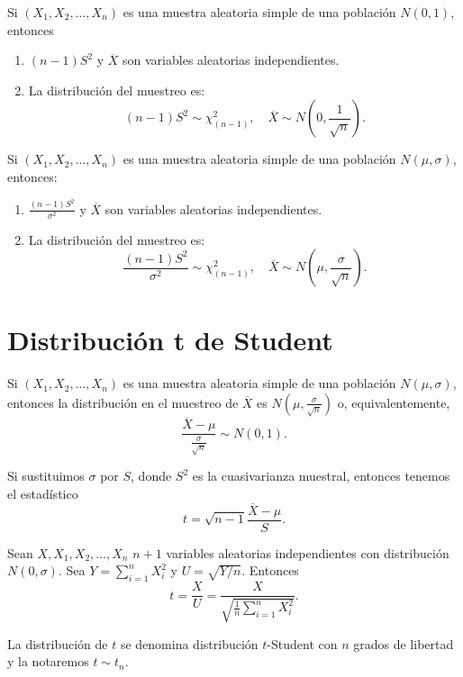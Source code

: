 \begin{theorem}
    Si $(X_1, X_2, \dots, X_n)$ es una muestra aleatoria simple de una población $N(0,1)$, entonces
    \begin{enumerate}
        \item $(n-1)S^2$ y $\overline{X}$ son variables aleatorias independientes.
        \item La distribución del muestreo es:
              $$(n-1)S^2 \sim \chi_{(n-1)}^2, \quad \overline{X} \sim N\left( 0, \frac{1}{\sqrt{n}} \right).$$
    \end{enumerate}
\end{theorem}

\begin{theorem}
    Si $(X_1, X_2, \dots, X_n)$ es una muestra aleatoria simple de una población $N(\mu,\sigma)$, entonces:
    \begin{enumerate}
        \item $\frac{(n-1)S^2}{\sigma^2}$ y $\overline{X}$ son variables aleatorias independientes.
        \item La distribución del muestreo es:
              $$\frac{(n-1)S^2}{\sigma^2} \sim \chi_{(n-1)}^2, \quad \overline{X} \sim N\left(\mu, \frac{\sigma}{\sqrt{n}}\right).$$
    \end{enumerate}
\end{theorem}

\section{Distribución t de Student}
Si $(X_1,X_2, \dots,X_n)$ es una muestra aleatoria simple de una población $N(\mu,\sigma)$, entonces la distribución en el muestreo de $\overline{X}$ es $N\left(\mu, \frac{\sigma}{\sqrt{n}}\right)$ o, equivalentemente,
$$\frac{\overline{X} - \mu}{\frac{\sigma}{\sqrt{n}}} \sim N(0,1).$$

Si sustituimos $\sigma$ por $S$, donde $S^2$ es la cuasivarianza muestral, entonces tenemos el estadístico
$$t = \sqrt{n -1}\frac{\overline{X} - \mu}{S}.$$

\begin{definition}
    Sean $X, X_1, X_2, \dots, X_n$ $n +1$ variables aleatorias independientes con distribución $N(0, \sigma)$.
    Sea $Y = \sum_{i=1}^n X_i^2$ y $U = \sqrt{Y/n}$.
    Entonces
    $$t = \frac{X}{U} = \frac{X}{\sqrt{\frac{1}{n} \sum_{i=1}^n X_i^2}}.$$

    La distribución de $t$ se denomina distribución $t$-Student con $n$ grados de libertad y la notaremos $t \sim t_n$.
\end{definition}

